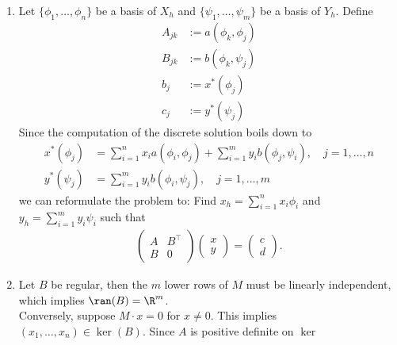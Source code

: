 \begin{solution}

\phantom{}

\begin{enumerate}[label = \textbf{\alph*)}]
  \item Let $\{\phi_1,\dots,\phi_n\}$ be a basis of $X_h$ and
  $\{\psi_1,\dots,\psi_m\}$ be a basis of $Y_h$. Define
  \begin{align*}
    A_{jk} &:= a(\phi_k,\phi_j) \\
    B_{jk} &:= b(\phi_k,\psi_j) \\
    b_j &:= x^*(\phi_j) \\
    c_j &:= y^*(\psi_j)
  \end{align*}
  Since the computation of the discrete solution boils down to
  \begin{align*}
    x^*(\phi_j) &= \sum_{i=1}^n x_ia(\phi_i,\phi_j) + \sum_{i=1}^m y_i b(\phi_j,\psi_i), \quad j = 1,\dots,n \\
    y^*(\psi_j) &= \sum_{i=1}^m y_i b(\phi_i,\psi_j), \quad j = 1,\dots,m
  \end{align*}
  we can reformulate the problem to: Find $x_h = \sum_{i=1}^n x_i \phi_i$
  and $y_h = \sum_{i=1}^m y_i \psi_i$ such that
  \begin{align*}
    \begin{pmatrix}
      A & B^{\top} \\
      B & 0
    \end{pmatrix}
    \begin{pmatrix}
      x \\ y
    \end{pmatrix}
    =
    \begin{pmatrix}
      c \\ d
    \end{pmatrix}.
  \end{align*}
  \item Let $B$ be regular, then the $m$ lower rows of $M$ must be linearly independent,
  which implies $\ran(B) = \R^m$. \\
  Conversely, suppose $M\cdot x = 0$ for $x \neq 0$. This implies $(x_1,\dots,x_n) \in \ker(B)$.
  Since $A$ is positive definite on $\ker$
\end{enumerate}

\end{solution}

